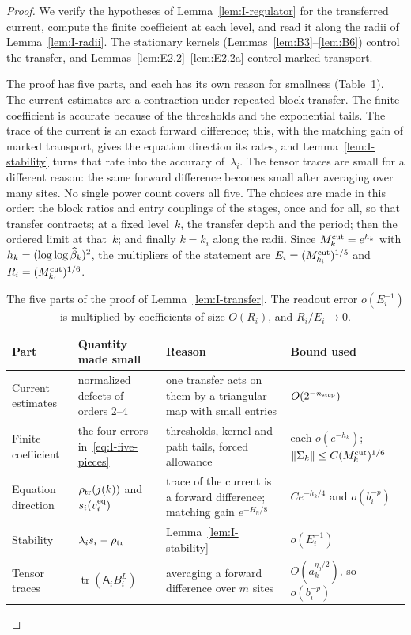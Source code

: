 \begin{proof}
We verify the hypotheses of Lemma~\ref{lem:I-regulator} for the transferred current, compute the finite coefficient at each level, and read it along the radii of Lemma~\ref{lem:I-radii}. The stationary kernels (Lemmas~\ref{lem:B3}--\ref{lem:B6}) control the transfer, and Lemmas~\ref{lem:E2.2}--\ref{lem:E2.2a} control marked transport.

The proof has five parts, and each has its own reason for smallness (Table~\ref{tab:I-transfer-rates}). The current estimates are a contraction under repeated block transfer. The finite coefficient is accurate because of the thresholds and the exponential tails. The trace of the current is an exact forward difference; this, with the matching gain of marked transport, gives the equation direction its rates, and Lemma~\ref{lem:I-stability} turns that rate into the accuracy of~$\lambda_i$. The tensor traces are small for a different reason: the same forward difference becomes small after averaging over many sites. No single power count covers all five. The choices are made in this order: the block ratios and entry couplings of the stages, once and for all, so that transfer contracts; at a fixed level~$k$, the transfer depth and the period; then the ordered limit at that~$k$; and finally $k=k_i$ along the radii. Since $M^{\mathrm{cut}}_k=e^{h_k}$ with $h_k=(\log\log\widehat{\beta}_k)^2$, the multipliers of the statement are $E_i=(M^{\mathrm{cut}}_{k_i})^{1/5}$ and $R_i=(M^{\mathrm{cut}}_{k_i})^{1/6}$.

\begin{table}[ht]
\centering\small
\begin{tabular}{@{}lp{3.3cm}p{4.5cm}p{3.6cm}@{}}
\toprule
Part & Quantity made small & Reason & Bound used\\
\midrule
Current estimates & \raggedright normalized defects of orders $2$--$4$ & \raggedright one transfer acts on them by a triangular map with small entries & $O(2^{-n_{\rm step}})$\\
Finite coefficient & \raggedright the four errors in~\eqref{eq:I-five-pieces} & \raggedright thresholds, kernel and path tails, forced allowance & each $o(e^{-h_k})$;\newline $\|\Sigma_k\|\le C(M^{\mathrm{cut}}_k)^{1/6}$\\
Equation direction & \raggedright $\rho_{\rm tr}(j(k))$ and $s_i(v_i^{\rm eq})$ & \raggedright trace of the current is a forward difference; matching gain $e^{-H_n/8}$ & $Ce^{-h_k/4}$ and $o(b_i^{-p})$\\
Stability & \raggedright $\lambda_is_i-\rho_{\rm tr}$ & \raggedright Lemma~\ref{lem:I-stability} & $o(E_i^{-1})$\\
Tensor traces & \raggedright $\operatorname{tr}(\mathsf A_iB_i^L)$ & \raggedright averaging a forward difference over $m$ sites & $O(a_k^{\eta_0/2})$, so $o(b_i^{-p})$\\
\bottomrule
\end{tabular}
\caption{The five parts of the proof of Lemma~\ref{lem:I-transfer}. The readout error $o(E_i^{-1})$ is multiplied by coefficients of size $O(R_i)$, and $R_i/E_i\to0$.}\label{tab:I-transfer-rates}
\end{table}


\end{proof}
